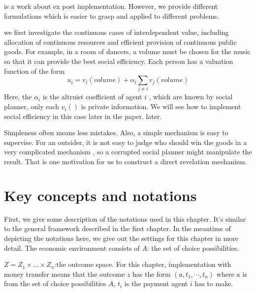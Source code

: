  \parencite{Ely2006} is a work about ex post implementation. However, we provide different formulations which is easier to grasp and applied to different problems.
 
 we first investigate the continuous
 cases of interdependent value,  including allocation of continuous resources and efficient provision of continuous public goods. 
 For example, in a room of dancers, a volume must be chosen for the music so that it can provide the best social efficiency. Each person
 has a valuation function of the form 
 $$u_i= v_i(volume) + \alpha_i\sum_{j\neq i}v_j(volume)$$
 Here, the $\alpha_i$ is the altruist coefficient of agent $i$ , which are known by social planner, only each $v_i()$ is private information. We will see how to implement social efficiency in this case later in the paper. 
 later.


 
Simpleness often means less mistakes. Also, a simple mechanism is  easy to supervise. For an outsider, it is not easy to judge who should win the goods in a very complicated mechanism
, so a corrupted social planner might manipulate the result. That is one motivation for us to construct a direct revelation mechanism.





\section{Key concepts and notations}
First, we give some description of the notations used in this chapter. It's similar to the general framework described in the first chapter. In the meantime of depicting the notations here, we give out the settings for this 
chapter in more detail.
The economic environment consists of
$A$: the set of choice possibilities.

$Z=Z_1\times \dots\times Z_n$:the outcome space. For this chapter, implementation with money transfer means that the 
outcome $z$ has the form $(a, t_1,\cdots,t_n)$ where $a$ is from the set of choice possibilities $A$, $t_i$ is 
the payment agent $i$ has to make.

